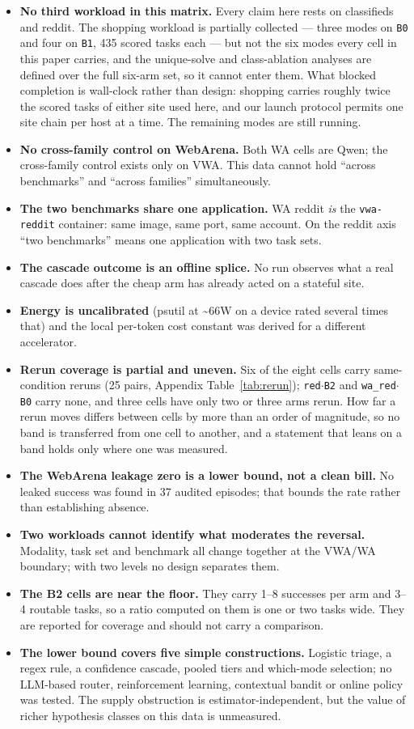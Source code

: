 \begin{itemize}
\tightlist
\item
  \textbf{No third workload in this matrix.} Every claim here rests on classifieds and reddit. The shopping workload is partially collected --- three modes on \texttt{B0} and four on \texttt{B1}, 435 scored tasks each --- but not the six modes every cell in this paper carries, and the unique-solve and class-ablation analyses are defined over the full six-arm set, so it cannot enter them. What blocked completion is wall-clock rather than design: shopping carries roughly twice the scored tasks of either site used here, and our launch protocol permits one site chain per host at a time. The remaining modes are still running.
\item
  \textbf{No cross-family control on WebArena.} Both WA cells are Qwen; the cross-family control exists only on VWA. This data cannot hold ``across benchmarks'' and ``across families'' simultaneously.
\item
  \textbf{The two benchmarks share one application.} WA reddit \emph{is} the \texttt{vwa-reddit} container: same image, same port, same account. On the reddit axis ``two benchmarks'' means one application with two task sets.
\item
  \textbf{The cascade outcome is an offline splice.} No run observes what a real cascade does after the cheap arm has already acted on a stateful site.
\item
  \textbf{Energy is uncalibrated} (psutil at \textasciitilde66W on a device rated several times that) and the local per-token cost constant was derived for a different accelerator.
\item
  \textbf{Rerun coverage is partial and uneven.} Six of the eight cells carry same-condition reruns (25 pairs, Appendix Table~\ref{tab:rerun}); \texttt{red$\cdot$B2} and \texttt{wa\_red$\cdot$B0} carry none, and three cells have only two or three arms rerun. How far a rerun moves differs between cells by more than an order of magnitude, so no band is transferred from one cell to another, and a statement that leans on a band holds only where one was measured.
\item
  \textbf{The WebArena leakage zero is a lower bound, not a clean bill.} No leaked success was found in 37 audited episodes; that bounds the rate rather than establishing absence.
\item
  \textbf{Two workloads cannot identify what moderates the reversal.} Modality, task set and benchmark all change together at the VWA/WA boundary; with two levels no design separates them.
\item
  \textbf{The B2 cells are near the floor.} They carry 1--8 successes per arm and 3--4 routable tasks, so a ratio computed on them is one or two tasks wide. They are reported for coverage and should not carry a comparison.
\item
  \textbf{The lower bound covers five simple constructions.} Logistic triage, a regex rule, a confidence cascade, pooled tiers and which-mode selection; no LLM-based router, reinforcement learning, contextual bandit or online policy was tested. The supply obstruction is estimator-independent, but the value of richer hypothesis classes on this data is unmeasured.
\end{itemize}
